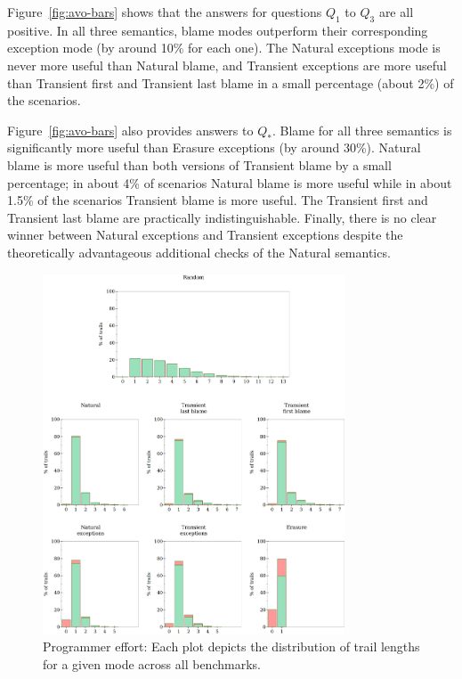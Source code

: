 Figure~\ref{fig:avo-bars} shows that the answers for questions $Q_1$ to $Q_3$ are all positive.
In all three semantics, blame modes outperform their corresponding exception mode (by around 10\% for each one).
The Natural exceptions mode is never more useful than Natural blame, and  Transient
exceptions are more useful than Transient first and Transient last blame
in a small percentage (about 2\%) of the scenarios. 

Figure~\ref{fig:avo-bars} also provides answers to $Q_*$.
Blame for all three semantics is significantly
more useful than Erasure exceptions (by around 30\%). Natural blame is
more useful than both versions of Transient blame by a small percentage;
in about 4\% of scenarios Natural blame is more useful while in about 1.5\% of the
scenarios Transient blame is more useful. The Transient first and
Transient last blame are practically indistinguishable. Finally, there is
no clear winner between Natural exceptions and Transient exceptions
despite the theoretically advantageous additional checks of the Natural
semantics.

\begin{figure}
  \centering
  \includegraphics[width=0.8\textwidth]{./plots/bt-lengths-table}
  \caption{Programmer effort: Each plot depicts the distribution of trail
  lengths for a given mode across all benchmarks.}
  \label{fig:effort-table}
\end{figure}

